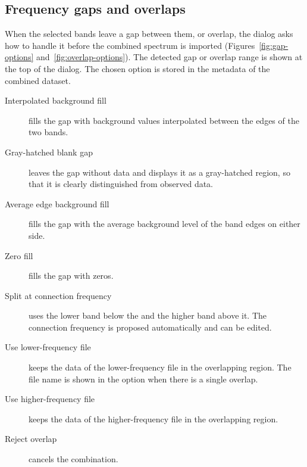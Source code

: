 \subsection{Frequency gaps and overlaps}
\label{sec:gap-overlap}

When the selected bands leave a gap between them, or overlap, the  dialog asks how to handle it before the combined spectrum is imported
(Figures~\ref{fig:gap-options} and~\ref{fig:overlap-options}). The detected gap or overlap
range is shown at the top of the dialog. The chosen option is stored in the metadata of the
combined dataset.


\begin{description}
  \item[Interpolated background fill] fills the gap with background values interpolated
    between the edges of the two bands.
  \item[Gray-hatched blank gap] leaves the gap without data and displays it as a
    gray-hatched region, so that it is clearly distinguished from observed data.
  \item[Average edge background fill] fills the gap with the average background level of
    the band edges on either side.
  \item[Zero fill] fills the gap with zeros.
\end{description}


\begin{description}
  \item[Split at connection frequency] uses the lower band below the
     and the higher band above it. The connection frequency is
    proposed automatically and can be edited.
  \item[Use lower-frequency file] keeps the data of the lower-frequency file in the
    overlapping region. The file name is shown in the option when there is a single overlap.
  \item[Use higher-frequency file] keeps the data of the higher-frequency file in the
    overlapping region.
  \item[Reject overlap] cancels the combination.
\end{description}

